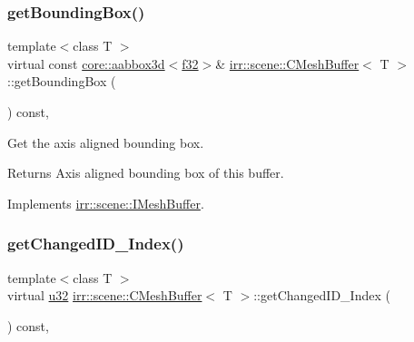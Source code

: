 \subsubsection{\texorpdfstring{get\+Bounding\+Box()}{getBoundingBox()}}
{\footnotesize\ttfamily template$<$class T $>$ \\
virtual const \hyperlink{classirr_1_1core_1_1aabbox3d}{core\+::aabbox3d}$<$\hyperlink{namespaceirr_a0277be98d67dc26ff93b1a6a1d086b07}{f32}$>$\& \hyperlink{classirr_1_1scene_1_1CMeshBuffer}{irr\+::scene\+::\+C\+Mesh\+Buffer}$<$ T $>$\+::get\+Bounding\+Box (\begin{DoxyParamCaption}{ }\end{DoxyParamCaption}) const\hspace{0.3cm}{\ttfamily [inline]}, {\ttfamily [virtual]}}



Get the axis aligned bounding box. 

\begin{DoxyReturn}{Returns}
Axis aligned bounding box of this buffer. 
\end{DoxyReturn}


Implements \hyperlink{classirr_1_1scene_1_1IMeshBuffer_ac53fe1096756a40f25dae25911e27c51}{irr\+::scene\+::\+I\+Mesh\+Buffer}.

\mbox{\label{classirr_1_1scene_1_1CMeshBuffer_aec6786022abd81ddf8d4e79a23628944}} 
\subsubsection{\texorpdfstring{get\+Changed\+I\+D\+\_\+\+Index()}{getChangedID\_Index()}}
{\footnotesize\ttfamily template$<$class T $>$ \\
virtual \hyperlink{namespaceirr_a0416a53257075833e7002efd0a18e804}{u32} \hyperlink{classirr_1_1scene_1_1CMeshBuffer}{irr\+::scene\+::\+C\+Mesh\+Buffer}$<$ T $>$\+::get\+Changed\+I\+D\+\_\+\+Index (\begin{DoxyParamCaption}{ }\end{DoxyParamCaption}) const\hspace{0.3cm}{\ttfamily [inline]}, {\ttfamily [virtual]}}



